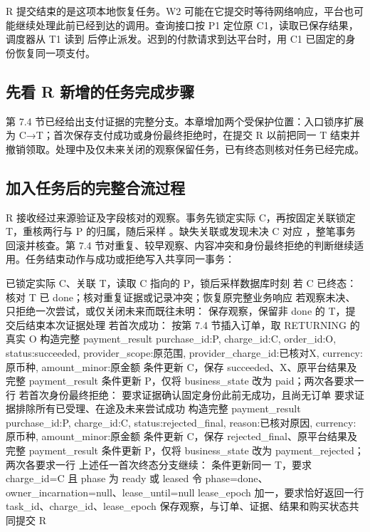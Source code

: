 R 提交结束的是这项本地恢复任务。W2 可能在它提交时等待网络响应，平台也可能继续处理此前已经到达的调用。查询接口按 P1 定位原 C1，读取已保存结果，调度器从 T1 读到  后停止派发。迟到的付款请求到达平台时，用 C1 已固定的身份恢复同一项支付。

\subsection*{先看 R 新增的任务完成步骤}

第 7.4 节已经给出支付证据的完整分支。本章增加两个受保护位置：入口锁序扩展为 C→T；首次保存支付成功或身份最终拒绝时，在提交 R 以前把同一 T 结束并撤销领取。处理中及仅未来关闭的观察保留任务，已有终态则核对任务已经完成。


\subsection*{加入任务后的完整合流过程}

R 接收经过来源验证及字段核对的观察。事务先锁定实际 C，再按固定关联锁定 T，重核两行与 P 的归属，随后采样 。缺失关联或发现未决 C 对应 ，整笔事务回滚并核查。第 7.4 节对重复、较早观察、内容冲突和身份最终拒绝的判断继续适用。任务结束动作与成功或拒绝写入共享同一事务：

\begin{BookCode}
已锁定实际 C、关联 T，读取 C 指向的 P，锁后采样数据库时刻
若 C 已终态：
    核对 T 已 done；核对重复证据或记录冲突；恢复原完整业务响应
若观察未决、只拒绝一次尝试，或仅关闭未来而既往未明：
    保存观察，保留非 done 的 T，提交后结束本次证据处理
若首次成功：
    按第 7.4 节插入订单，取 RETURNING 的真实 O
    构造完整 payment_result {purchase_id:P, charge_id:C, order_id:O,
        status:succeeded, provider_scope:原范围,
        provider_charge_id:已核对X, currency:原币种, amount_minor:原金额}
    条件更新 C，保存 succeeded、X、原平台结果及完整 payment_result
    条件更新 P，仅将 business_state 改为 paid；两次各要求一行
若首次身份最终拒绝：
    要求证据确认固定身份此前无成功，且尚无订单
    要求证据排除所有已受理、在途及未来尝试成功
    构造完整 payment_result {purchase_id:P, charge_id:C, status:rejected_final,
        reason:已核对原因, currency:原币种, amount_minor:原金额}
    条件更新 C，保存 rejected_final、原平台结果及完整 payment_result
    条件更新 P，仅将 business_state 改为 payment_rejected；两次各要求一行
上述任一首次终态分支继续：
    条件更新同一 T，要求 charge_id=C 且 phase 为 ready 或 leased
    令 phase=done、owner_incarnation=null、lease_until=null
    lease_epoch 加一，要求恰好返回一行 task_id、charge_id、lease_epoch
    保存观察，与订单、证据、结果和购买状态共同提交 R
\end{BookCode}

